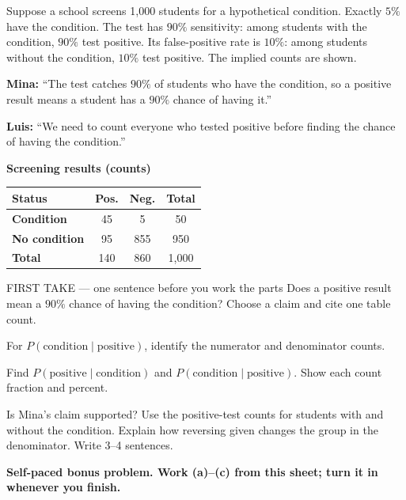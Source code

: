 \documentclass[14pt]{extarticle}
\begin{document}
\pagestyle{empty}


\noindent\begin{minipage}[t]{0.57\linewidth}
\vspace{0pt}
Suppose a school screens 1{,}000 students for a hypothetical condition. Exactly $5\%$ have the condition. The test has $90\%$ sensitivity: among students with the condition, $90\%$ test positive. Its false-positive rate is $10\%$: among students without the condition, $10\%$ test positive. The implied counts are shown.\par\smallskip \textbf{Mina:} ``The test catches $90\%$ of students who have the condition, so a positive result means a student has a $90\%$ chance of having it.''\par \textbf{Luis:} ``We need to count everyone who tested positive before finding the chance of having the condition.''\par
\end{minipage}\hfill
\begin{minipage}[t]{0.40\linewidth}
\vspace{0pt}
\begin{center}
\textbf{Screening results (counts)}\par\smallskip
\begin{tabular}{|l|c|c|c|}
\hline
\textbf{Status} & \textbf{Pos.} & \textbf{Neg.} & \textbf{Total} \\ \hline
\textbf{Condition} & 45 & 5 & 50 \\ \hline
\textbf{No condition} & 95 & 855 & 950 \\ \hline
\textbf{Total} & 140 & 860 & 1{,}000 \\ \hline
\end{tabular}
\end{center}
\end{minipage}

\begin{firsttakebox}{FIRST TAKE --- one sentence before you work the parts}
Does a positive result mean a $90\%$ chance of having the condition? Choose a claim and cite one table count.
\end{firsttakebox}

\begin{description}[leftmargin=1.15in, labelwidth=1in, itemsep=2pt, topsep=2pt]
  \item[\dokbadge{1}~(a)] For $P(\text{condition}\mid\text{positive})$, identify the numerator and denominator counts.
  \item[\dokbadge{2}~(b)] Find $P(\text{positive}\mid\text{condition})$ and $P(\text{condition}\mid\text{positive})$. Show each count fraction and percent.
  \item[\dokbadge{3}~(c)] Is Mina's claim supported? Use the positive-test counts for students with and without the condition. Explain how reversing given changes the group in the denominator. Write 3--4 sentences.
\end{description}

\vfill
\textbf{Self-paced bonus problem. Work (a)--(c) from this sheet; turn it in whenever you finish.}
\end{document}
